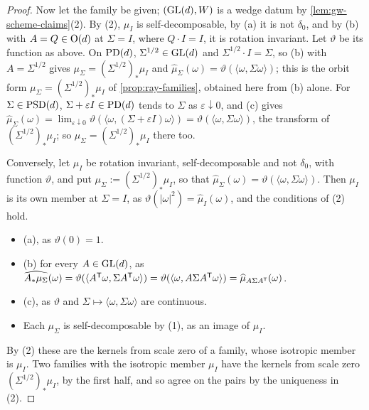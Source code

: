 \begin{proof}
Now let the family be given; $(\mathrm{GL}(d), W)$ is a wedge datum by \ref{lem:gw-scheme-claims}(2). By (2),
$\mu_I$ is self-decomposable, by (a) it is not $\delta_0$, and by (b) with $A = Q \in \mathrm{O}(d)$ at
$\Sigma = I$, where $Q \cdot I = I$, it is rotation invariant. Let $\vartheta$ be its function as above. On
$\mathrm{PD}(d)$, $\Sigma^{1/2} \in \mathrm{GL}(d)$ and $\Sigma^{1/2}\cdot I = \Sigma$, so (b) with $A = \Sigma^{1/2}$ gives
$\mu_\Sigma = (\Sigma^{1/2})_*\mu_I$ and $\widehat\mu_\Sigma(\omega) = \vartheta(\langle\omega,\Sigma\omega\rangle)$;
this is the orbit form $\mu_\Sigma = (\Sigma^{1/2})_*\mu_I$ of \ref{prop:ray-families}, obtained here from
(b) alone. For
$\Sigma \in \mathrm{PSD}(d)$, $\Sigma + \varepsilon I \in \mathrm{PD}(d)$ tends to $\Sigma$ as $\varepsilon \downarrow 0$,
and (c) gives $\widehat\mu_\Sigma(\omega) = \lim_{\varepsilon\downarrow0}\vartheta(\langle\omega,(\Sigma +
\varepsilon I)\omega\rangle) = \vartheta(\langle\omega,\Sigma\omega\rangle)$, the transform of
$(\Sigma^{1/2})_*\mu_I$; so $\mu_\Sigma = (\Sigma^{1/2})_*\mu_I$ there too.

Conversely, let $\mu_I$ be rotation invariant, self-decomposable and not $\delta_0$, with function $\vartheta$,
and put $\mu_\Sigma := (\Sigma^{1/2})_*\mu_I$, so that $\widehat\mu_\Sigma(\omega) =
\vartheta(\langle\omega,\Sigma\omega\rangle)$. Then $\mu_I$ is its own member at $\Sigma = I$, as
$\vartheta(|\omega|^2) = \widehat\mu_I(\omega)$, and the conditions of (2) hold.
\begin{itemize}
\item (a), as $\vartheta(0) = 1$.
\item (b) for every $A \in \mathrm{GL}(d)$, as $\widehat{A_*\mu_\Sigma}(\omega) =
\vartheta(\langle A^{\mathsf{T}}\omega,\Sigma A^{\mathsf{T}}\omega\rangle) = \vartheta(\langle\omega,A\Sigma A^{\mathsf{T}}\omega\rangle) =
\widehat\mu_{A\Sigma A^{\mathsf{T}}}(\omega)$.
\item (c), as $\vartheta$ and $\Sigma \mapsto \langle\omega,\Sigma\omega\rangle$ are continuous.
\item Each $\mu_\Sigma$ is self-decomposable by (1), as an image of $\mu_I$.
\end{itemize} By (2) these are the kernels from scale zero of a family, whose isotropic
member is $\mu_I$. Two families with the isotropic member $\mu_I$ have the kernels from scale zero
$(\Sigma^{1/2})_*\mu_I$, by the first half, and so agree on the pairs by the uniqueness in (2).
\end{proof}

